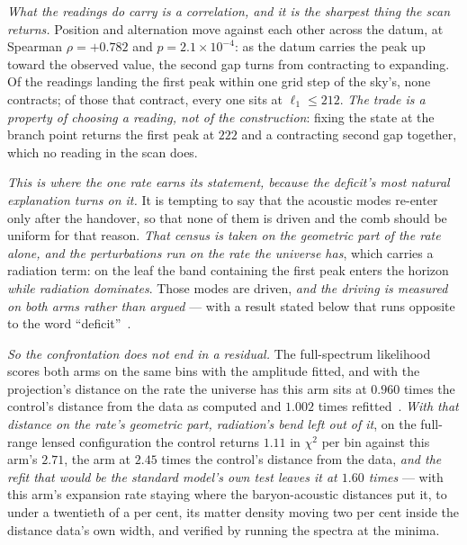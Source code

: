 \documentclass[11pt,a4paper]{article}
\theoremstyle{plain}
\theoremstyle{definition}
\begin{document}
\emph{What the readings do carry is a correlation, and it is the sharpest thing the scan returns.} Position
and alternation move against each other across the datum, at Spearman $\rho=+0.782$ and
$p=2.1\times10^{-4}$: as the datum carries the peak up toward the observed value, the second gap turns from
contracting to expanding. Of the readings landing the first peak within one grid step of the sky's, none
contracts; of those that contract, every one sits at $\ell_1\le212$. \emph{The trade is a property of choosing
a reading, not of the construction}: fixing the state at the branch point returns the first peak at $222$ and a
contracting second gap together, which no reading in the scan does.

\emph{This is where the one rate earns its statement, because the deficit's most natural explanation
turns on it.} It is tempting to say that the acoustic modes re-enter only after the handover, so that none
of them is driven and the comb should be uniform for that reason. \emph{That census is taken on the geometric
part of the rate alone, and the perturbations run on the rate the universe has}, which carries a radiation term: on the leaf the
band containing the first peak enters the horizon \emph{while radiation dominates}. Those modes are driven,
\emph{and the driving is measured on both arms rather than argued} --- with a result stated below that runs
opposite to the word ``deficit''~\cite{JanzenCRcosmology}.

\emph{So the confrontation does not end in a residual.} The full-spectrum likelihood scores both arms on the same bins with the amplitude fitted, and with the projection's distance on the rate the universe has this arm sits at $0.960$ times the control's distance from the data as computed and $1.002$ times refitted~\cite{JanzenCRcosmology}. \emph{With that distance on the rate's geometric part, radiation's bend left out of it}, on the full-range lensed configuration the control returns $1.11$ in $\chi^{2}$ per bin against this arm's $2.71$, the arm at $2.45$ times the control's distance from the data, \emph{and the refit that would be the standard model's own test leaves it at $1.60$ times} --- with this arm's expansion rate staying where the baryon-acoustic distances put it, to under a twentieth of a per cent, its matter density moving two per cent inside the distance data's own width, and verified by running the spectra at the minima.
\end{document}
